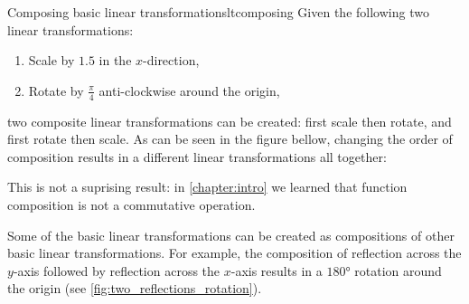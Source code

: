 \begin{example}{Composing basic linear transformations}{ltcomposing}
	Given the following two linear transformations:
	\begin{enumerate}
		\item Scale by $1.5$ in the $x$-direction,
		\item Rotate by $\frac{\pi}{4}$ anti-clockwise around the origin,
	\end{enumerate}
	two composite linear transformations can be created: first scale then rotate, and first rotate then scale. As can be seen in the figure bellow, changing the order of composition results in a different linear transformations all together:

	\begin{center}
	\end{center}

	This is not a suprising result: in \autoref{chapter:intro} we learned that function composition is not a commutative operation.
\end{example}

Some of the basic linear transformations can be created as compositions of other basic linear transformations. For example, the composition of reflection across the $y$-axis followed by reflection across the $x$-axis results in a $\ang{180}$ rotation around the origin (see \autoref{fig:two_reflections_rotation}).

